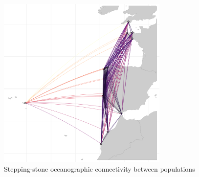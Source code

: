 \documentclass[
]{article}
\begin{document}
\begin{figure}
\centering
\includegraphics[width=0.75\textwidth,height=\textheight]{../img/Example1_img_3.png}
\caption{Stepping-stone oceanographic connectivity between populations}
\end{figure}
\end{document}
